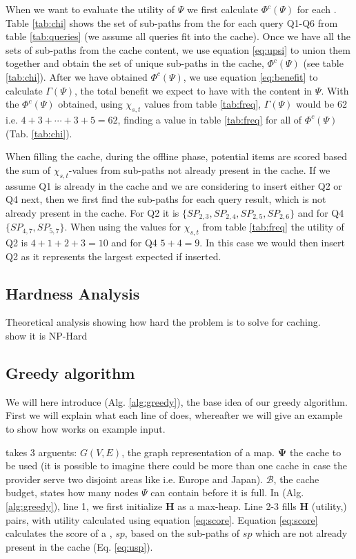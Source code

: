 When we want to evaluate the utility of $\Psi$ we first calculate $\Phi^c(\Psi)$ for each \spath. Table \ref{tab:chi} shows the set of sub-paths from the \spaths for each query Q1-Q6 from table \ref{tab:queries} (we assume all queries fit into the cache). Once we have all the sets of sub-paths from the cache content, we use equation \ref{eq:upsi} to union them together and obtain the set of unique sub-paths in the cache, $\Phi^c(\Psi)$ (see table \ref{tab:chi}). After we have obtained $\Phi^c(\Psi)$, we use equation \ref{eq:benefit} to calculate $\Gamma(\Psi)$, the total benefit we expect to have with the content in $\Psi$. With the $\Phi^c(\Psi)$ obtained, using $\chi_{s,t}$ values from table \ref{tab:freq}, $\Gamma(\Psi)$ would be 62 i.e. $4+3+\dotsb+3+5 = 62$, finding a value in table \ref{tab:freq} for all \spaths of $\Phi^c(\Psi)$ (Tab. \ref{tab:chi}).

When filling the cache, during the offline phase, potential \spath items are scored based the sum of $\chi_{s,t}$-values from sub-paths not already present in the cache. If we assume Q1 is already in the cache and we are considering to insert either Q2 or Q4 next, then we first find the sub-paths for each query result, which is not already present in the cache. For Q2 it is $\{SP_{2,3},SP_{2,4},SP_{2,5},SP_{2,6}\}$ and for Q4 $\{SP_{4,7},SP_{5,7}\}$. When using the values for $\chi_{s,t}$ from table \ref{tab:freq} the utility of Q2 is $4+1+2+3=10$ and for Q4 $5+4=9$. In this case we would then insert Q2 as it represents the largest expected if inserted.

\subsection{Hardness Analysis}
Theoretical analysis showing how hard the problem is to solve for \spath caching.\\
show it is NP-Hard
 

\subsection{Greedy algorithm}
We will here introduce \salgo (Alg. \ref{alg:greedy}), the base idea of our greedy algorithm. First we will explain what each line of \salgo does, whereafter we will give an example to show how \salgo works on example input.

\salgo takes 3 arguents: $G(V,E)$, the graph representation of a map. $\mathbf{\Psi}$ the cache to be used (it is possible to imagine there could be more than one cache in case the \spath provider serve two disjoint areas like i.e. Europe and Japan). $\mathcal{B}$, the cache budget, states how many nodes $\Psi$ can contain before it is full.
In \salgo (Alg. \ref{alg:greedy}), line 1, we first initialize \textbf{H} as a max-heap. Line 2-3 fills \textbf{H} (utility,\spath) pairs, with utility calculated using equation \ref{eq:score}. 
Equation \ref{eq:score} calculates the score of a \spathns, $sp$, based on the sub-paths of $sp$ which are not already present in the cache (Eq. \ref{eq:usp}).

